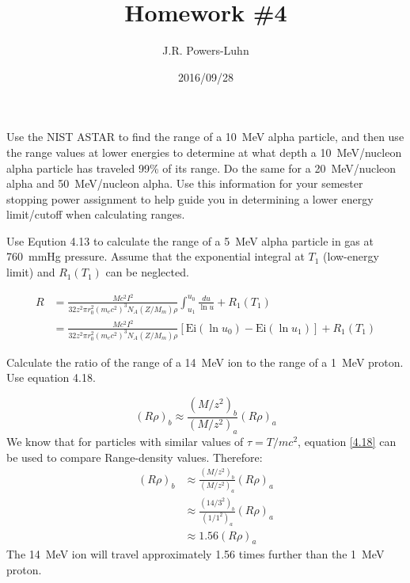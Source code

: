 \documentclass{hw}
\author{J.R. Powers-Luhn}
\date{2016/09/28}
\title{Homework \#4}
\begin{document}
\problem{}
Use the NIST ASTAR to find the range of a \SI{10}{\mega\electronvolt} alpha particle, and then use the range values at lower energies to determine at what depth a \SI{10}{\mega\electronvolt}/nucleon alpha particle has traveled 99\% of its range. Do the same for a \SI{20}{\mega\electronvolt}/nucleon alpha and \SI{50}{\mega\electronvolt}/nucleon alpha. Use this information for your semester stopping power assignment to help guide you in determining a lower energy limit/cutoff when calculating ranges.
\solution

Use Eqution 4.13 to calculate the range of a \SI{5}{\mega\electronvolt} alpha particle in  gas at \SI{760}{\mmHg} pressure. Assume that the exponential integral at $ T_1 $ (low-energy limit) and $ R_1(T_1) $ can be neglected.

\begin{align*}
	R &= \frac{M c^2 I^2}{32 z^2 \pi r_0^2 \left( m_e c^2 \right)^3 N_A \left(Z / M_m \right) \rho} \int^{u_0}_{u_1} \frac{du}{\ln u} + R_1 \left( T_1 \right) \\
	&= \frac{M c^2 I^2}{32 z^2 \pi r_0^2 \left( m_e c^2 \right)^3 N_A \left(Z / M_m \right) \rho} \left[ \text{Ei}\left(\ln u_0 \right) - \text{Ei}\left( \ln u_1 \right) \right] + R_1 \left( T_1 \right) \tag{4.13}
\end{align*}
\solution

Calculate the ratio of the range of a \SI{14}{\mega\electronvolt}  ion to the range of a \SI{1}{\mega\electronvolt} proton. Use equation 4.18.

\begin{equation}
	\left( R \rho \right)_b \approx \frac{\left( M/z^2 \right)_b}{\left( M / z^2 \right)_a} \left( R \rho \right)_a \tag{4.18}
	\label{4.18}
\end{equation}
\solution
We know that for particles with similar values of $ \tau = T / m c^2 $, equation \ref{4.18} can be used to compare Range-density values. Therefore:
\begin{align*}
	\left( R \rho \right)_b &\approx \frac{\left( M/z^2 \right)_b}{\left( M / z^2 \right)_a} \left( R \rho \right)_a \\
	&\approx \frac{\left( 14/3^2 \right)_b}{\left( 1 / 1^2 \right)_a} \left( R \rho \right)_a \\
	&\approx 1.56 \left( R \rho \right)_a
\end{align*}
The \SI{14}{\mega\electronvolt}  ion will travel approximately \num{1.56} times further than the \SI{1}{\mega\electronvolt} proton.
\end{document}
